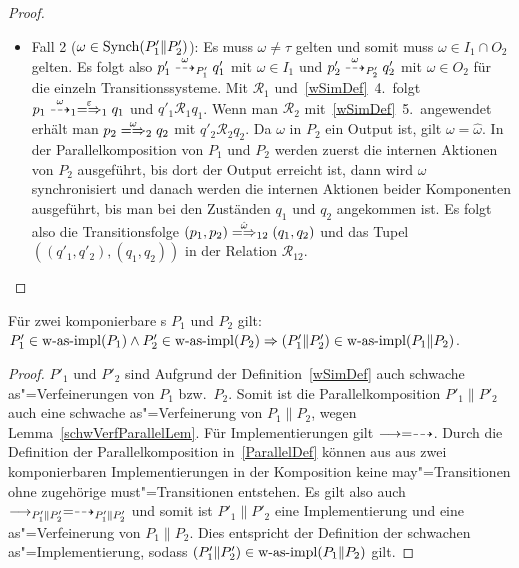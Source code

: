 \begin{proof}
\begin{enumerate}
\begin{itemize}
        \item Fall 2 ($\omega\in\mathrm{Synch} (P'_1\|P'_2)$): Es muss $\omega\neq\tau$
          gelten und somit muss \oBdA{} $\omega\in I_1\cap O_2$ gelten. Es
          folgt also $p'_1\may[\omega]_{P'_1} q'_1$ mit $\omega\in I_1$ und
          $p'_2\may[\omega]_{P'_2} q'_2$ mit $\omega\in O_2$ für die einzeln
          Transitionssysteme. Mit $\mathcal{R}_1$ und~\ref{wSimDef}~4.\ folgt
          $p_1\may[\omega]_1 \weakmay[\varepsilon]_1 q_1$ und $q'_1
          \mathcal{R}_1 q_1$. Wenn man $\mathcal{R}_2$ mit~\ref{wSimDef}~5.\
          angewendet erhält man $p_2 \weakmay[\omega]_2 q_2$ mit
          $q'_2\mathcal{R}_2 q_2$. Da $\omega$ in $P_2$ ein Output ist, gilt
          $\omega =\hat{\omega}$. In der Parallelkomposition von $P_1$ und
          $P_2$ werden zuerst die internen Aktionen von $P_2$ ausgeführt, bis
          dort der Output erreicht ist, dann wird $\omega$ synchronisiert und
          danach werden die internen Aktionen beider Komponenten ausgeführt,
          bis man bei den Zuständen $q_1$ und $q_2$ angekommen ist. Es folgt
          also die Transitionsfolge $(p_1,p_2) \weakmay[\hat{\omega}]_{12}
          (q_1,q_2)$ und das Tupel $((q'_1,q'_2),(q_1,q_2))$ in der Relation
          $\mathcal{R}_{12}$.
      \end{itemize}
  \end{enumerate}
\end{proof}

\begin{Kor}
  \label{schwImpParallelKor}
  Für zwei komponierbare \MEIO{}s $P_1$ und $P_2$ gilt:
  $P'_1\in\mathrm{w}\text{-}\mathrm{as}\text{-}\mathrm{impl} (P_1) \land P'_2 \in\mathrm{w}\text{-}\mathrm{as}\text{-}\mathrm{impl} (P_2) \Rightarrow (P'_1\|P'_2)
  \in\mathrm{w}\text{-}\mathrm{as}\text{-}\mathrm{impl} (P_1\|P_2)$.
\end{Kor}
\begin{proof}
  $P'_1$ und $P'_2$ sind Aufgrund der Definition~\ref{wSimDef} auch schwache
  as"=Verfeinerungen von $P_1$ bzw.\ $P_2$. Somit ist die Parallelkomposition
  $P'_1\|P'_2$ auch eine schwache as"=Verfeinerung von $P_1\|P_2$, wegen
  Lemma~\ref{schwVerfParallelLem}. Für Implementierungen gilt $\must =\may$.
  Durch die Definition der Parallelkomposition in~\ref{ParallelDef} können aus
  aus zwei komponierbaren Implementierungen in der Komposition keine
  may"=Transitionen ohne zugehörige must"=Transitionen entstehen. Es gilt also
  auch $\must _{P'_1\|P'_2} =\may _{P'_1\|P'_2}$ und somit ist $P'_1\|P'_2$
  eine Implementierung und eine as"=Verfeinerung von $P_1\|P_2$. Dies
  entspricht der Definition der schwachen as"=Implementierung, sodass
  $(P'_1\|P'_2)\in\mathrm{w}\text{-}\mathrm{as}\text{-}\mathrm{impl} (P_1\|P_2)$ gilt.
\end{proof}

